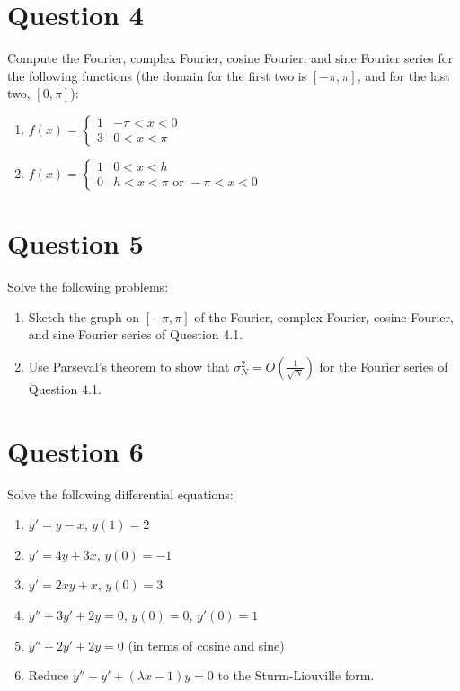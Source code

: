 \documentclass[lang=en,11pt]{template}
\begin{document}
\section*{Question 4}
Compute the Fourier, complex Fourier, cosine Fourier, and sine Fourier series for the following functions (the domain for the first two is $[-\pi, \pi]$, and for the last two, $[0, \pi]$):
\begin{enumerate}
    \item $f(x) = \begin{cases} 
        1 & -\pi < x < 0 \\
        3 & 0 < x < \pi 
    \end{cases}$
    \item $f(x) = \begin{cases} 
        1 & 0 < x < h \\
        0 & h < x < \pi \text{ or } -\pi < x < 0
    \end{cases}$
\end{enumerate}

\section*{Question 5}
Solve the following problems:
\begin{enumerate}
    \item Sketch the graph on $[-\pi, \pi]$ of the Fourier, complex Fourier, cosine Fourier, and sine Fourier series of Question 4.1.
    \item Use Parseval’s theorem to show that $\sigma_N^2 = O\left(\frac{1}{\sqrt{N}}\right)$ for the Fourier series of Question 4.1.
\end{enumerate}

\section*{Question 6}
Solve the following differential equations:
\begin{enumerate}
    \item $y' = y - x$, $y(1) = 2$
    \item $y' = 4y + 3x$, $y(0) = -1$
    \item $y' = 2xy + x$, $y(0) = 3$
    \item $y'' + 3y' + 2y = 0$, $y(0) = 0$, $y'(0) = 1$
    \item $y'' + 2y' + 2y = 0$ (in terms of cosine and sine)
    \item Reduce $y'' + y' + (\lambda x - 1)y = 0$ to the Sturm-Liouville form.
\end{enumerate}
\end{document}
